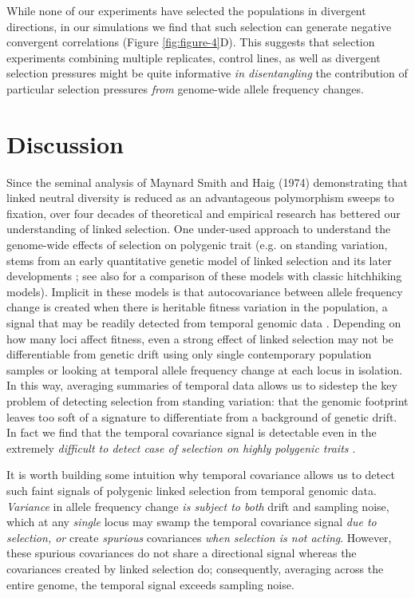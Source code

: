 \documentclass[9pt,twocolumn,twoside]{pnas-new}
\newcommand{\vb}[1]{{\it \color{red} #1}}
\begin{document}
While none of our experiments have selected the populations in divergent
directions, in our simulations we find that such selection can generate
negative convergent correlations (Figure \ref{fig:figure-4}D). This suggests
that selection experiments combining multiple replicates, control lines, as
well as divergent selection pressures might be quite informative \vb{in
disentangling} the contribution of particular selection pressures \vb{from}
genome-wide allele frequency changes.

\section*{Discussion}

Since the seminal analysis of Maynard Smith and Haig (1974) demonstrating that
linked neutral diversity is reduced as an advantageous polymorphism sweeps to
fixation, over four decades of theoretical and empirical research has bettered
our understanding of linked selection.  One under-used approach to understand
the genome-wide effects of selection on polygenic trait (e.g.  on standing
variation, stems from an early quantitative genetic model of linked selection
\cite{Robertson1961-ho} and its later developments
\cite{Santiago1995-hx,Santiago1998-bs,Wray1990-zf,Woolliams1993-qo}; see also
\cite{Barton2000-zg} for a comparison of these models with classic hitchhiking
models). Implicit in these models is that autocovariance between allele
frequency change is created when there is heritable fitness variation in the
population, a signal that may be readily detected from temporal genomic data
\cite{Buffalo2019-io}.  Depending on how many loci affect fitness, even a
strong effect of linked selection may not be differentiable from genetic drift
using only single contemporary population samples or looking at temporal allele
frequency change at each locus in isolation. In this way, averaging summaries
of temporal data allows us to sidestep the key problem of detecting selection
from standing variation: that the genomic footprint leaves too soft of a
signature to differentiate from a background of genetic drift. In fact we find
that the temporal covariance signal is detectable even in the extremely
\vb{difficult to detect case of selection on highly polygenic traits
\cite{Buffalo2019-io}}.

It is worth building some intuition why temporal covariance allows us to detect
such faint signals of polygenic linked selection from temporal genomic data.
\vb{Variance} in allele frequency change \vb{is subject to both} drift and
sampling noise, which at any \vb{single} locus may swamp the temporal
covariance signal \vb{due to selection, or} create \vb{spurious} covariances
\vb{when selection is not acting}.  However, these spurious covariances do not
share a directional signal whereas the covariances created by linked selection
do; consequently, averaging across the entire genome, the temporal signal
exceeds sampling noise. 
\end{document}
